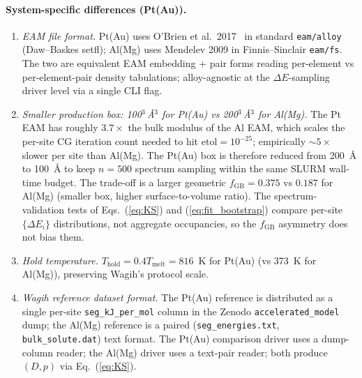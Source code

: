 \paragraph*{System-specific differences (Pt(Au)).}
\begin{enumerate}\itemsep0pt
\item \emph{EAM file format.} Pt(Au) uses O'Brien et al.\
   2017~\cite{OBrien2017} in standard \texttt{eam/alloy} (Daw--Baskes
   setfl); Al(Mg) uses Mendelev 2009 in Finnis--Sinclair
   \texttt{eam/fs}. The two are equivalent EAM embedding + pair forms
   reading per-element vs per-element-pair density tabulations;
   alloy-agnostic at the $\Delta E$-sampling driver level via
   a single CLI flag.
\item \emph{Smaller production box: 100$^3$\,\AA$^3$ for Pt(Au) vs
   200$^3$\,\AA$^3$ for Al(Mg).} The Pt EAM has roughly $3.7\times$
   the bulk modulus of the Al EAM, which scales the per-site CG
   iteration count needed to hit $\mathrm{etol} = 10^{-25}$;
   empirically $\sim 5\times$ slower per site than Al(Mg). The
   Pt(Au) box is therefore reduced from 200~\AA{} to 100~\AA{} to
   keep $n = 500$ spectrum sampling within the same SLURM wall-time
   budget. The trade-off is a larger geometric $f_\mathrm{GB} =
   0.375$ vs $0.187$ for Al(Mg) (smaller box, higher
   surface-to-volume ratio). The spectrum-validation tests of
   Eqs.~(\ref{eq:KS}) and (\ref{eq:fit_bootstrap}) compare per-site
   $\{\Delta E_i\}$ distributions, not aggregate occupancies, so the
   $f_\mathrm{GB}$ asymmetry does not bias them.
\item \emph{Hold temperature.} $T_\mathrm{hold} = 0.4 T_\mathrm{melt}
   = 816$~K for Pt(Au) (vs 373~K for Al(Mg)), preserving Wagih's
   protocol scale.
\item \emph{Wagih reference dataset format.} The Pt(Au) reference is
   distributed as a single per-site \texttt{seg\_kJ\_per\_mol} column
   in the Zenodo \texttt{accelerated\_model} dump; the Al(Mg)
   reference is a paired (\texttt{seg\_energies.txt},
   \texttt{bulk\_solute.dat}) text format. The Pt(Au) comparison
   driver uses a dump-column reader; the Al(Mg) driver uses a
   text-pair reader; both produce $(D, p)$ via Eq.~(\ref{eq:KS}).
\end{enumerate}

